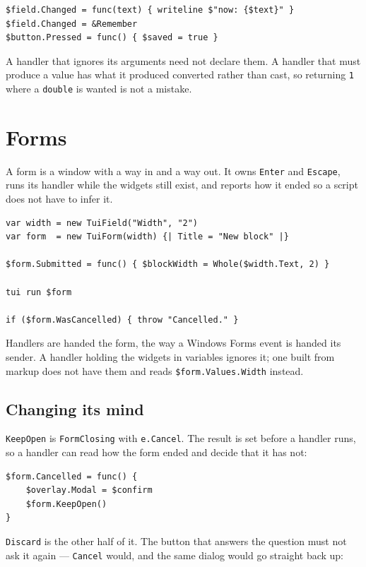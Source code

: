 \documentclass[11pt,a4paper,twoside,openany]{book}
\newcommand{\tosh}[1]{\lstinline[language=tosh]{#1}}
\newcommand{\code}[1]{\texttt{\small #1}}
\begin{document}
\begin{lstlisting}
$field.Changed = func(text) { writeline $"now: {$text}" }
$field.Changed = &Remember
$button.Pressed = func() { $saved = true }
\end{lstlisting}

A handler that ignores its arguments need not declare them. A handler that must
produce a value has what it produced converted rather than cast, so returning
\tosh{1} where a \code{double} is wanted is not a mistake.

\section{Forms}

A form is a window with a way in and a way out. It owns \code{Enter} and
\code{Escape}, runs its handler while the widgets still exist, and reports how it
ended so a script does not have to infer it.

\begin{lstlisting}
var width = new TuiField("Width", "2")
var form  = new TuiForm(width) {| Title = "New block" |}

$form.Submitted = func() { $blockWidth = Whole($width.Text, 2) }

tui run $form

if ($form.WasCancelled) { throw "Cancelled." }
\end{lstlisting}

Handlers are handed the form, the way a Windows Forms event is handed its sender.
A handler holding the widgets in variables ignores it; one built from markup does
not have them and reads \code{\$form.Values.Width} instead.

\subsection{Changing its mind}

\code{KeepOpen} is \code{FormClosing} with \code{e.Cancel}. The result is set
before a handler runs, so a handler can read how the form ended and decide that it
has not:

\begin{lstlisting}
$form.Cancelled = func() {
    $overlay.Modal = $confirm
    $form.KeepOpen()
}
\end{lstlisting}

\code{Discard} is the other half of it. The button that answers the question must
not ask it again --- \code{Cancel} would, and the same dialog would go straight
back up:
\end{document}
